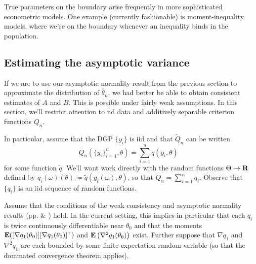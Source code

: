 \documentclass[11pt,letterpaper,reqno,oneside]{article}
\begin{document}
\begin{example}
	True parameters on the boundary arise frequently in more sophisticated econometric models. One example (currently fashionable) is moment-inequality models, where we're on the boundary whenever an inequality binds in the population.
\end{example}



\subsection{Estimating the asymptotic variance}
\label{sec:extremum:estimating_asymp_variance}

If we are to use our asymptotic normality result from the previous section to approximate the distribution of $\widehat{\theta}_n$, we had better be able to obtain consistent estimates of $A$ and $B$. This is possible under fairly weak assumptions. In this section, we'll restrict attention to iid data and additively separable criterion functions $Q_n$.

In particular, assume that the DGP $\{ y_i \}$ is iid and that $\widetilde{Q}_n$ can be written
%
\begin{equation*}
	\widetilde{Q}_n(\{y_i\}_{i=1}^n,\theta)
	= \sum_{i=1}^n \widetilde{q}(y_i,\theta) 
\end{equation*}
%
for some function $\widetilde{q}$. We'll want work directly with the random functions $\Theta \to \mathbf{R}$ defined by $q_i(\omega)(\theta) \coloneqq \widetilde{q}(y_i(\omega),\theta)$, so that $Q_n = \sum_{i=1}^n q_i$. Observe that $\{ q_i \}$ is an iid sequence of random functions.


Assume that the conditions of the weak consistency and asymptotic normality results (pp. \pageref{proposition:weak_consistency} \& \pageref{proposition:asymptotic_normality}) hold. In the current setting, this implies in particular that each $q_i$ is twice continuously differentiable near $\theta_0$ and that the moments $\mathbf{E}( [ \nabla q_1(\theta_0) ] [ \nabla q_1(\theta_0) ]^{\scriptscriptstyle \top} )$ and $\mathbf{E}\left( \nabla^2 q_1(\theta_0) \right)$ exist. Further suppose that $\nabla q_1$ and $\nabla^2 q_1$ are each bounded by some finite-expectation random variable (so that the dominated convergence theorem applies).
\end{document}
